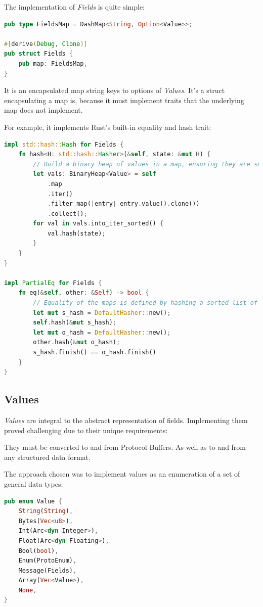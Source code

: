 \documentclass[a4paper,12pt]{report}
\begin{document}
The implementation of \textit{Fields} is quite simple:

\begin{lstlisting}[language=Rust]
pub type FieldsMap = DashMap<String, Option<Value>>;

#[derive(Debug, Clone)]
pub struct Fields {
    pub map: FieldsMap,
}
\end{lstlisting}

It is an encapsulated map string keys to options \cite{option} of \textit{Values}.
It's a struct encapsulating a map is, because it must implement traits that the underlying map does not implement.

For example, it implements Rust's built-in equality and hash trait:

\begin{lstlisting}[language=Rust]
impl std::hash::Hash for Fields {
    fn hash<H: std::hash::Hasher>(&self, state: &mut H) {
        // Build a binary heap of values in a map, ensuring they are sorted.
        let vals: BinaryHeap<Value> = self
            .map
            .iter()
            .filter_map(|entry| entry.value().clone())
            .collect();
        for val in vals.into_iter_sorted() {
            val.hash(state);
        }
    }
}

impl PartialEq for Fields {
    fn eq(&self, other: &Self) -> bool {
        // Equality of the maps is defined by hashing a sorted list of thier values and comparing them.
        let mut s_hash = DefaultHasher::new();
        self.hash(&mut s_hash);
        let mut o_hash = DefaultHasher::new();
        other.hash(&mut o_hash);
        s_hash.finish() == o_hash.finish()
    }
}
\end{lstlisting}

\subsection{Values}

\textit{Values} are integral to the abstract representation of fields. 
Implementing them proved challenging due to their unique requirements:

They must be converted to and from Protocol Buffers. As well as to and from any structured data format.

The approach chosen was to implement values as an enumeration of a set of general data types:

\begin{lstlisting}[language=Rust]
pub enum Value {
    String(String),
    Bytes(Vec<u8>),
    Int(Arc<dyn Integer>),
    Float(Arc<dyn Floating>),
    Bool(bool),
    Enum(ProtoEnum),
    Message(Fields),
    Array(Vec<Value>),
    None,
}
\end{lstlisting}
\end{document}
